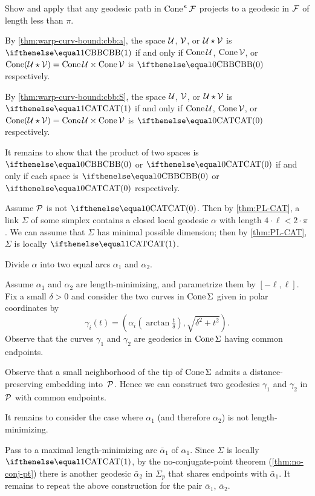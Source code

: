 Show and apply that any geodesic path in $\mathop{\rm Cone}\nolimits^\upkappa\mathcal{F}$ projects to a geodesic in $\mathcal{F}$ of length less than $\pi$.

By \ref{thm:warp-curv-bound:cbb:a}, the space $\mathcal{U}$, $\mathcal{V}$, or $\mathcal{U}\star\mathcal{V}$ is $\Alex1$ if and only if $\mathop{\rm Cone}\nolimits\mathcal{U}$, $\mathop{\rm Cone}\nolimits\mathcal{V}$, or $\Cone(\spc{U}\star\spc{V})=\Cone\spc{U}\times\Cone\spc{V}$ is $\Alex0$ respectively.

By \ref{thm:warp-curv-bound:cbb:S}, the space $\mathcal{U}$, $\mathcal{V}$, or $\mathcal{U}\star\mathcal{V}$ is $\CAT1$ if and only if $\mathop{\rm Cone}\nolimits\mathcal{U}$, $\mathop{\rm Cone}\nolimits\mathcal{V}$, or $\Cone(\spc{U}\star\spc{V})=\Cone\spc{U}\times\Cone\spc{V}$ is $\CAT0$ respectively.

It remains to show that the product of two spaces is $\Alex0$ or $\CAT0$ if and only if each space is $\Alex0$ or $\CAT0$ respectively.

Assume $\mathcal{P}$ is not $\CAT0$.
Then by \ref{thm:PL-CAT}, a link $\Sigma$ of some simplex contains a closed local geodesic $\alpha$ with length $4\cdot\ell<2\cdot\pi$.
We can assume that $\Sigma$ has minimal possible dimension;
then by \ref{thm:PL-CAT}, $\Sigma$ is locally $\CAT1$.

Divide $\alpha$ into two equal arcs $\alpha_1$ and $\alpha_2$.

Assume $\alpha_1$ and $\alpha_2$ are length-minimizing, and 
parametrize them by $[-\ell,\ell]$.
Fix a small $\delta>0$ and 
consider the two curves in $\mathop{\rm Cone}\nolimits\Sigma$ given in polar coordinates by 
\[\gamma_i(t)=(\alpha_i(\arctan \tfrac t\delta),\sqrt{\delta^2+t^2}).\]
Observe that the curves $\gamma_1$ and $\gamma_2$ are geodesics in $\mathop{\rm Cone}\nolimits\Sigma$ having common endpoints.

Observe that a small neighborhood of the tip of $\mathop{\rm Cone}\nolimits\Sigma$ admits a distance-preserving embedding into~$\mathcal{P}$.
Hence we can construct two geodesics $\gamma_1$ and $\gamma_2$ in $\mathcal{P}$ with common endpoints.

It remains to consider the case where $\alpha_1$ (and therefore $\alpha_2$) is not length-minimizing.

Pass to a maximal length-minimizing arc $\bar\alpha_1$ of $\alpha_1$.
Since $\Sigma$ is locally $\CAT1$, by the no-conjugate-point theorem (\ref{thm:no-conj-pt}) 
there is another geodesic $\bar\alpha_2$ in $\Sigma_p$ that shares endpoints with $\bar\alpha_1$.
It remains to repeat the above construction for the pair $\bar\alpha_1$, $\bar\alpha_2$.

